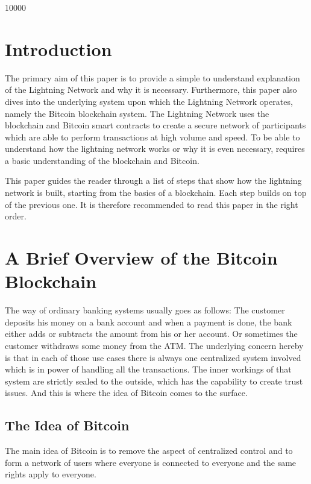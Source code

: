 \documentclass[a4paper, 12pt]{report}
\begin{document}
 10000
\raggedbottom

\chapter{Introduction}
\par The primary aim of this paper is to provide a simple to understand explanation of the Lightning Network and why it is necessary. Furthermore, this paper also dives into the underlying system upon which the Lightning Network operates, namely the Bitcoin blockchain system. The Lightning Network uses the blockchain and Bitcoin smart contracts to create a secure network of participants which are able to perform transactions at high volume and speed. To be able to understand how the lightning network works or why it is even necessary, requires a basic understanding of the blockchain and Bitcoin.
\par This paper guides the reader through a list of steps that show how the lightning network is built, starting from the basics of a blockchain. Each step builds on top of the previous one. It is therefore recommended to read this paper in the right order.

\chapter{A Brief Overview of the Bitcoin Blockchain}
\par The way of ordinary banking systems usually goes as follows: The customer deposits his money on a bank account and when a payment is done, the bank either adds or subtracts the amount from his or her account. Or sometimes the customer withdraws some money from the ATM. The underlying concern hereby is that in each of those use cases there is always one centralized system involved which is in power of handling all the transactions. The inner workings of that system are strictly sealed to the outside, which has the capability to create trust issues. And this is where the idea of Bitcoin comes to the surface.

\section{The Idea of Bitcoin}
\par The main idea of Bitcoin is to remove the aspect of centralized control and to form a network of users where everyone is connected to everyone and the same rights apply to everyone.  
\end{document}
